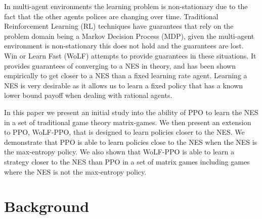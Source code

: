 \documentclass[conference]{IEEEtran}
\begin{document}
In multi-agent environments the learning problem is non-stationary due to the fact that the other agents polices are changing over time. Traditional Reinforcement Learning (RL) techniques have guarantees that rely on the problem domain being a Markov Decision Process (MDP), given the multi-agent environment is non-stationary this does not hold and the guarantees are lost. Win or Learn Fast (WoLF) attempts to provide guarantees in these situations\cite{bowling2002multiagent}. It provides guarantees of converging to a NES in theory, and has been shown empirically to get closer to a NES than a fixed learning rate agent. Learning a NES is very desirable as it allows us to learn a fixed policy that has a known lower bound payoff when dealing with rational agents.

In this paper we present an initial study into the ability of PPO to learn the NES in a set of traditional game theory matrix-games. We then present an extension to PPO, WoLF-PPO, that is designed to learn policies closer to the NES. We demonstrate that PPO is able to learn policies close to the NES when the NES is the max-entropy policy. We also shown that WoLF-PPO is able to learn a strategy closer to the NES than PPO in a set of matrix games including games where the NES is not the max-entropy policy.

\section{Background}


\end{document}
